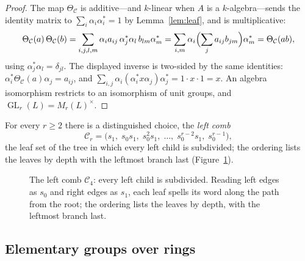\documentclass[11pt]{amsart}
\theoremstyle{definition}
\theoremstyle{plain}
\newcommand{\GL}{\operatorname{GL}}
\begin{document}
\begin{proof}
The map \(\Theta_{\mathcal C}\) is additive---and \(k\)-linear when \(A\) is a \(k\)-algebra---sends the identity matrix to \(\sum_i\alpha_i\alpha_i^*=1\) by Lemma~\ref{lem:leaf}, and is multiplicative:
\[
 \Theta_{\mathcal C}(a)\,\Theta_{\mathcal C}(b)
 =\sum_{i,j,l,m}\alpha_i a_{ij}\,\alpha_j^*\alpha_l\,b_{lm}\alpha_m^*
 =\sum_{i,m}\alpha_i\Bigl(\sum_j a_{ij}b_{jm}\Bigr)\alpha_m^*
 =\Theta_{\mathcal C}(ab),
\]
using \(\alpha_j^*\alpha_l=\delta_{jl}\).  The displayed inverse is two-sided by the same identities: \(\alpha_i^*\Theta_{\mathcal C}(a)\alpha_j=a_{ij}\), and \(\sum_{i,j}\alpha_i(\alpha_i^*x\alpha_j)\alpha_j^*=1\cdot x\cdot 1=x\).  An algebra isomorphism restricts to an isomorphism of unit groups, and \(\GL_r(L)=M_r(L)^\times\).
\end{proof}

For every \(r\geq2\) there is a distinguished choice, the \emph{left comb}
\begin{equation}\label{eq:comb}
 \mathcal C_r=\bigl(s_1,\;s_0s_1,\;s_0^2s_1,\;\dots,\;s_0^{r-2}s_1,\;s_0^{r-1}\bigr),
\end{equation}
the leaf set of the tree in which every left child is subdivided; the ordering lists the leaves by depth with the leftmost branch last (Figure~\ref{fig:comb}).

\begin{figure}[t]
\centering
{}
\caption{The left comb $\mathcal C_4$: every left child is subdivided.  Reading left edges as $s_0$ and right edges as $s_1$, each leaf spells its word along the path from the root; the ordering lists the leaves by depth, with the leftmost branch last.}
\label{fig:comb}
\end{figure}

\subsection{Elementary groups over rings}\label{subsec:elementary}
\end{document}
